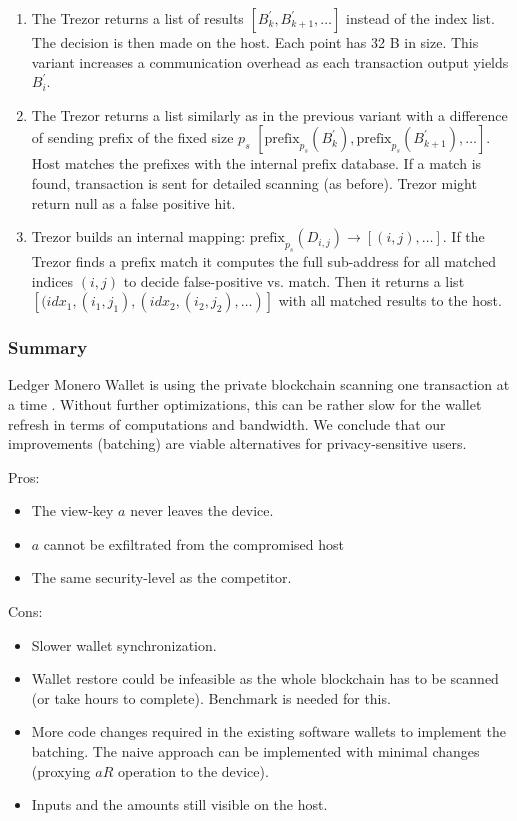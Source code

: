 \documentclass[]{article}
\begin{document}
\begin{enumerate}
	\item The Trezor returns a list of results $\left[B^{\prime}_k, B^{\prime}_{k+1}, \dots\right]$ instead of the index list. The decision is then made on the host. Each point has 32 B in size. This variant increases a communication overhead as each transaction output yields $B^{\prime}_i$.
	
	\item The Trezor returns a list similarly as in the previous variant with a difference of sending prefix of the fixed size $p_s$
	$\left[\text{prefix}_{p_s}\left(B^{\prime}_k\right), \text{prefix}_{p_s}\left(B^{\prime}_{k+1}\right), \dots\right]$. Host matches the prefixes with the internal prefix database. If a match is found, transaction is sent for detailed scanning (as before). Trezor might return null as a false positive hit.
	
	\item Trezor builds an internal mapping: $\text{prefix}_{p_s}\left(D_{i,j}\right) \rightarrow \left[(i, j), \dots\right]$.
	If the Trezor finds a prefix match it computes the full sub-address for all matched indices $(i,j)$ to decide false-positive vs. match. Then it returns a list $\left[(idx_1, (i_1, j_1), (idx_2, (i_2, j_2), \dots)\right]$ with all matched results to the host. 
	
\end{enumerate}

\subsubsection{Summary}
Ledger Monero Wallet is using the private blockchain scanning one transaction at a time \cite{ledger_doc}. Without further optimizations, this can be rather slow for the wallet refresh in terms of computations and bandwidth.
We conclude that our improvements (batching) are viable alternatives for privacy-sensitive users.

\noindent Pros:
\begin{itemize}
	\item The view-key $a$ never leaves the device.
	\item $a$ cannot be exfiltrated from the compromised host
	\item The same security-level as the competitor.
\end{itemize}

\noindent Cons:
\begin{itemize}
	\item Slower wallet synchronization.
	\item Wallet restore could be infeasible as the whole blockchain has to be scanned (or take hours to complete). Benchmark is needed for this.
	\item More code changes required in the existing software wallets to implement the batching. The naive approach can be implemented with minimal changes (proxying $aR$ operation to the device).
	\item Inputs and the amounts still visible on the host.
\end{itemize}
\end{document}
